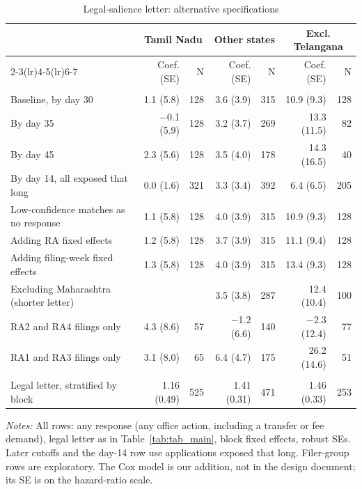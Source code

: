 \begin{table}[!htbp]
\centering
\caption{Legal-salience letter: alternative specifications}
\label{tab:tab_robust}
\footnotesize
\begin{threeparttable}
\begin{tabular}{lrrrrrr}
\toprule
& \multicolumn{2}{c}{Tamil Nadu} & \multicolumn{2}{c}{Other states} & \multicolumn{2}{c}{Excl. Telangana} \\ \cmidrule(lr){2-3}\cmidrule(lr){4-5}\cmidrule(lr){6-7}  & Coef. (SE) & N & Coef. (SE) & N & Coef. (SE) & N \\
\midrule
\addlinespace\multicolumn{7}{l}{\textit{Linear probability, any response (percentage points)}} \\
Baseline, by day 30 & 1.1 (5.8) & 128 & 3.6 (3.9) & 315 & 10.9 (9.3) & 128 \\
By day 35 & $-$0.1 (5.9) & 128 & 3.2 (3.7) & 269 & 13.3 (11.5) & 82 \\
By day 45 & 2.3 (5.6) & 128 & 3.5 (4.0) & 178 & 14.3 (16.5) & 40 \\
By day 14, all exposed that long & 0.0 (1.6) & 321 & 3.3 (3.4) & 392 & 6.4 (6.5) & 205 \\
Low-confidence matches as no response & 1.1 (5.8) & 128 & 4.0 (3.9) & 315 & 10.9 (9.3) & 128 \\
Adding RA fixed effects & 1.2 (5.8) & 128 & 3.7 (3.9) & 315 & 11.1 (9.4) & 128 \\
Adding filing-week fixed effects & 1.3 (5.8) & 128 & 4.0 (3.9) & 315 & 13.4 (9.3) & 128 \\
Excluding Maharashtra (shorter letter) &  &  & 3.5 (3.8) & 287 & 12.4 (10.4) & 100 \\
RA2 and RA4 filings only & 4.3 (8.6) & 57 & $-$1.2 (6.6) & 140 & $-$2.3 (12.4) & 77 \\
RA1 and RA3 filings only & 3.1 (8.0) & 65 & 6.4 (4.7) & 175 & 26.2 (14.6) & 51 \\
\addlinespace\multicolumn{7}{l}{\textit{Cox model, all filings (hazard ratio)}} \\
Legal letter, stratified by block & 1.16 (0.49) & 525 & 1.41 (0.31) & 471 & 1.46 (0.33) & 253 \\
\bottomrule
\end{tabular}
\begin{tablenotes}[flushleft]\footnotesize
\item \textit{Notes:} All rows: any response (any office action, including a transfer or fee demand), legal letter as in Table~\ref{tab:tab_main}, block fixed effects, robust SEs. Later cutoffs and the day-14 row use applications exposed that long. Filer-group rows are exploratory. The Cox model is our addition, not in the design document; its SE is on the hazard-ratio scale.
\end{tablenotes}
\end{threeparttable}
\end{table}
